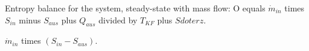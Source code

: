 Entropy balance for the system, steady-state with mass flow:  
O equals \( \dot{m}_{in} \) times \( S_{in} \) minus \( S_{aus} \) plus \( Q_{aus} \) divided by \( T_{KF} \) plus \( S dot erz \).  

\( \dot{m}_{in} \) times \( (S_{in} - S_{aus}) \).